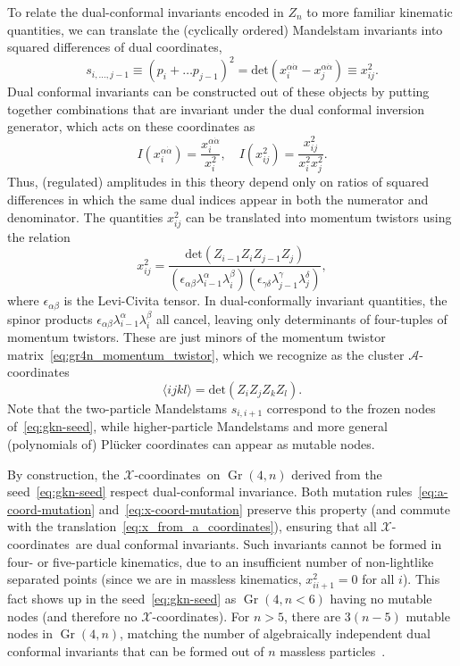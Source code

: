 \documentclass[11pt]{article}
\DeclareMathOperator{\Gr}{Gr}
\def\ket#1{\langle #1 \rangle}
\def\xcoords{$\mathcal{X}$-coordinates}
\def\acoords{$\mathcal{A}$-coordinates}
\begin{document}
To relate the dual-conformal invariants encoded in $Z_n$ to more familiar kinematic quantities, we can translate the (cyclically ordered) Mandelstam invariants into squared differences of dual coordinates,
\begin{equation} 
s_{i,\dots,j-1} \equiv (p_i + \dots p_{j-1})^2= \text{det}(x_i^{\alpha \dot \alpha} - x_j^{\alpha \dot \alpha}) \equiv x_{ij}^2. \label{eq:mandelstam_dual_coord}
\end{equation}
Dual conformal invariants can be constructed out of these objects by putting together combinations that are invariant under the dual conformal inversion generator, which acts on these coordinates as
\begin{equation}
I( x_i^{\alpha \dot \alpha}) = \frac{x_i^{\alpha \dot \alpha}}{x_i^2}, \quad  I(x_{ij}^2) = \frac{x_{ij}^2}{x_i^2 x_j^2}.
\end{equation}
Thus, (regulated) amplitudes in this theory depend only on ratios of squared differences in which the same dual indices appear in both the numerator and denominator. The quantities $x_{ij}^2$ can be translated into momentum twistors using the relation
\begin{equation}
x_{ij}^2 = \frac{\text{det}(Z_{i-1} Z_i Z_{j-1} Z_j)}{(\epsilon_{\alpha \beta} \lambda^\alpha_{i-1} \lambda^\beta_i) (\epsilon_{\gamma \delta} \lambda^\gamma_{j-1} \lambda^\delta_j)},
\end{equation}
where $\epsilon_{\alpha \beta}$ is the Levi-Civita tensor. In dual-conformally invariant quantities, the spinor products $\epsilon_{\alpha \beta} \lambda^\alpha_{i-1} \lambda^\beta_i$ all cancel, leaving only determinants of four-tuples of momentum twistors. These are just minors of the momentum twistor matrix~\eqref{eq:gr4n_momentum_twistor}, which we recognize as the cluster \acoords  
\begin{equation}
\ket{i j k l} = \text{det}(Z_i Z_j Z_k Z_l). \label{eq:def_four_bracket}
\end{equation}
Note that the two-particle Mandelstams $s_{i,i+1}$ correspond to the frozen nodes of~\eqref{eq:gkn-seed}, while higher-particle Mandelstams and more general (polynomials of) Pl\"ucker coordinates can appear as mutable nodes.

By construction, the \xcoords\ on $\Gr(4,n)$ derived from the seed~\eqref{eq:gkn-seed} respect dual-conformal invariance. Both mutation rules~\eqref{eq:a-coord-mutation} and~\eqref{eq:x-coord-mutation} preserve this property (and commute with the translation~\eqref{eq:x_from_a_coordinates}), ensuring that all \xcoords\ are dual conformal invariants. Such invariants cannot be formed in four- or five-particle kinematics, due to an insufficient number of non-lightlike separated points (since we are in massless kinematics, $x_{ii+1}^2 = 0$ for all $i$). This fact shows up in the seed~\eqref{eq:gkn-seed} as $\Gr(4,n<6)$ having no mutable nodes (and therefore no \xcoords). For $n>5$, there are $3(n-5)$ mutable nodes in $\Gr(4,n)$, matching the number of algebraically independent dual conformal invariants that can be formed out of $n$ massless particles~\cite{}. %
\end{document}
